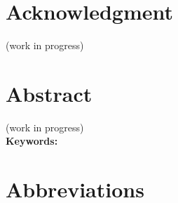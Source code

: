 \documentclass[12pt,a4paper,oneside]{book}
\begin{document}
\chapter*{Acknowledgment}
{\color{red}(work in progress)}
%
%
\chapter*{Abstract}
{\color{red}(work in progress)} \\
%
\noindent \textbf{Keywords:} 
%
%
\tableofcontents    					%
%
%
\listoffigures		%
\listoftables		%
%
%
\chapter*{Abbreviations}
\end{document}

